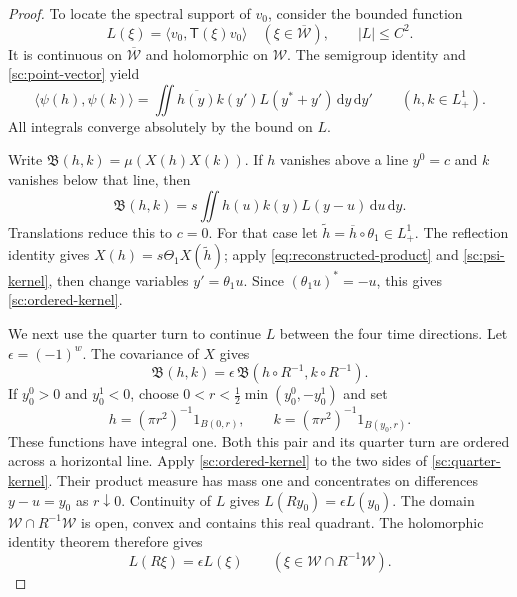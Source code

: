 \documentclass[11pt,letterpaper,reqno]{amsart}
\theoremstyle{definition}
\theoremstyle{remark}
\begin{document}
\begin{proof}
To locate the spectral support of $v_0$, consider the bounded function
\[
L(\xi)=\langle v_0,\mathsf T(\xi)v_0\rangle
\quad(\xi\in\overline{\mathcal W}),\qquad |L|\le C^2.
\]
It is continuous on $\overline{\mathcal W}$ and holomorphic on
$\mathcal W$.
The semigroup identity and \eqref{sc:point-vector} yield
\begin{equation}\label{sc:psi-kernel}
\langle\psi(h),\psi(k)\rangle
 =\iint\overline{h(y)}k(y')L(y^*+y')\,\mathrm dy\,\mathrm dy'
 \qquad(h,k\in L^1_+).
\end{equation}
All integrals converge absolutely by the bound on $L$.

Write $\mathfrak B(h,k)=\mu(X(h)X(k))$. If $h$ vanishes above a line
$y^0=c$ and $k$ vanishes below that line, then
\begin{equation}\label{sc:ordered-kernel}
\mathfrak B(h,k)
 =s\iint h(u)k(y)L(y-u)\,\mathrm du\,\mathrm dy.
\end{equation}
Translations reduce this to $c=0$. For that case let
$\widetilde h=\overline h\circ\theta_1\in L^1_+$. The reflection identity
gives $X(h)=s\Theta_1X(\widetilde h)$; apply
\eqref{eq:reconstructed-product} and \eqref{sc:psi-kernel}, then change variables
$y'=\theta_1u$. Since $(\theta_1u)^*=-u$, this gives
\eqref{sc:ordered-kernel}.

We next use the quarter turn to continue $L$ between the four time
directions. Let $\epsilon=(-1)^w$. The covariance of $X$ gives
\begin{equation}\label{sc:quarter-kernel}
\mathfrak B(h,k)=\epsilon\,
 \mathfrak B(h\circ R^{-1},k\circ R^{-1}).
\end{equation}
If $y_0^0>0$ and $y_0^1<0$, choose
$0<r<\frac12\min(y_0^0,-y_0^1)$ and set
\[
 h=(\pi r^2)^{-1}1_{B(0,r)},\qquad
 k=(\pi r^2)^{-1}1_{B(y_0,r)}.
\]
These functions have integral one. Both this pair and its quarter turn are
ordered across a horizontal line. Apply \eqref{sc:ordered-kernel} to the
two sides of \eqref{sc:quarter-kernel}. Their product measure has mass
one and concentrates on differences $y-u=y_0$ as $r\downarrow0$.
Continuity
of $L$ gives $L(Ry_0)=\epsilon L(y_0)$. The domain
$\mathcal W\cap R^{-1}\mathcal W$ is open, convex and contains this real
quadrant. The holomorphic identity theorem therefore gives
\begin{equation}\label{sc:quarter-L}
L(R\xi)=\epsilon L(\xi)
\qquad(\xi\in\mathcal W\cap R^{-1}\mathcal W).
\end{equation}


\end{proof}
\end{document}
